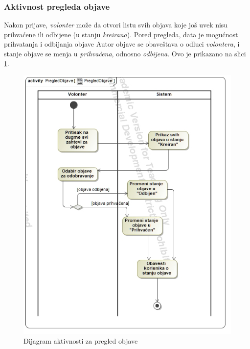 \subsubsection*{Aktivnost pregleda objave}
\par Nakon prijave, \textit{volonter} može da otvori listu svih objava koje još uvek nisu prihvaćene ili odbijene (u stanju \textit{kreirana}). Pored pregleda,
data je mogućnost prihvatanja i odbijanja objave Autor objave se obaveštava o odluci \textit{volontera}, i stanje objave se menja u \textit{prihvaćena}, odnosno
\textit{odbijena}. Ovo je prikazano na slici \ref{fig:activity-post-review}.
\begin{figure}[h]
    \centering
    \includegraphics[width=\textwidth, height=\textwidth]{img/activity-post-review.jpg}
    \caption{Dijagram aktivnosti za pregled objave}
    \label{fig:activity-post-review}
\end{figure}



